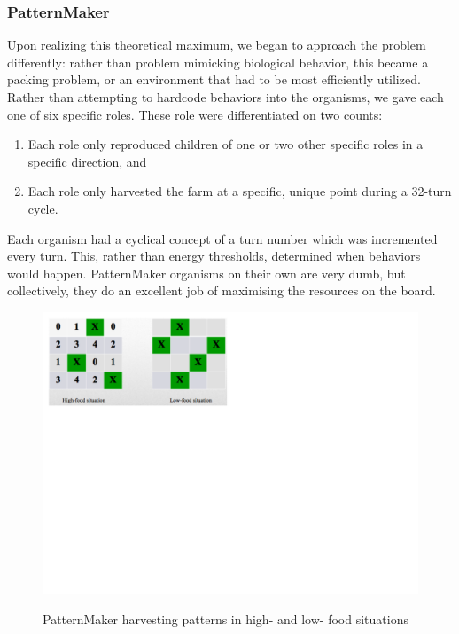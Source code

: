 \subsubsection{PatternMaker}
Upon realizing this theoretical maximum, we began to approach the
problem differently: rather than problem mimicking biological
behavior, this became a packing problem, or an environment that had to
be most efficiently utilized.  Rather than attempting to hardcode
behaviors into the organisms, we gave each one of six specific roles.
These role were differentiated on two counts:
\begin{enumerate}
\item Each role only reproduced children of one or two other specific roles in a specific direction, and
\item Each role only harvested the farm at a specific, unique point during a 32-turn cycle.
\end{enumerate}

Each organism had a cyclical concept of a turn number which was
incremented every turn.  This, rather than energy thresholds,
determined when behaviors would happen.  PatternMaker organisms on
their own are very dumb, but collectively, they do an excellent job of
maximising the resources on the board.

\begin{figure}[htf]
\centering
  \includegraphics[trim=10mm 130mm 135mm 0mm]{figs/high-low-food.pdf}\\
  \caption{PatternMaker harvesting patterns in high- and low- food situations}
  \label{fig:high-low-food}
\end{figure}



